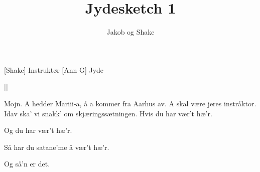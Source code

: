 \documentclass[a4paper,11pt]{article}
\title{Jydesketch 1}
\author{Jakob og Shake}
\begin{document}
\maketitle

\begin{roles}
[Shake] Instruktør
[Ann G] Jyde
\end{roles}

\begin{props}
[]
\end{props}

\begin{sketch}

 Mojn. A hedder Mariii-a, å a kommer fra Aarhus av. A skal være jeres instråktor. Idav ska’ vi snakk’ om skjæringssætningen. Hvis du har vær’t hæ’r.


 Og du har vær’t hæ’r.


 Så har du satane'me å vær’t hæ’r.


 Og så’n er det.
\end{sketch}
\end{document}
